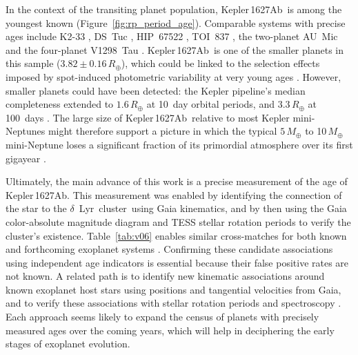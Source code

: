 \documentclass[12pt,modern,twocolumn,tighten,linenumbers,trackchanges]{aastex63}
\newcommand{\cn}{$\delta$\ Lyr\ cluster} %
\newcommand{\pn}{Kepler\,1627Ab} %
\begin{document}
In the context of the transiting planet population, \pn\ is among the
youngest known (Figure~\ref{fig:rp_period_age}).  Comparable systems
with precise ages include K2-33
\citep{Mann_K2_33b_2016,David_et_al_2017}, DS~Tuc
\citep{benatti_possibly_2019,newton_tess_2019} , HIP~67522
\citep{rizzuto_tess_2020}, TOI~837 \citep{bouma_cluster_2020}, the
two-planet AU~Mic \citep{plavchan_planet_2020,martioli_aumicbc_2021}
and the four-planet V1298~Tau \citep{david_four_2019}.  \pn\ is one of
the smaller planets in this sample ($3.82\pm0.16\,R_\oplus$), which
could be linked to the selection effects imposed by spot-induced
photometric variability at very young ages \citep[{\it
e.g.},][]{zhou_2021_tois}.  However, smaller planets could have been
detected: the Kepler pipeline's median completeness extended to
$1.6\,R_\oplus$ at 10~day orbital periods, and $3.3\,R_\oplus$ at
100~days \citep{2021ascl.soft07027B}.  The large size of \pn\ relative
to most Kepler mini-Neptunes might therefore support a picture
in which the typical $5\,M_\oplus$ to 10$\,M_\oplus$ mini-Neptune
\citep{wu_mass_2019} loses a significant fraction of its primordial
atmosphere over its first gigayear
\citep{Owen_Wu_2013,ginzburg_corepowered_2018}.  


Ultimately, the main advance of this work is a precise measurement of
the age of \pn.   This measurement was enabled by identifying the
connection of the star to the \cn\ using Gaia kinematics, and by then 
using the Gaia color-absolute magnitude diagram and TESS stellar
rotation periods to verify the cluster's existence.
Table~\ref{tab:v06} enables similar cross-matches for both known and
forthcoming exoplanet systems \citep[{\it
e.g.},][]{guerrero_tess_2021}. Confirming these candidate associations
using independent age indicators is essential because their false
positive rates are not known.  A related path is to identify new
kinematic associations around known exoplanet host stars using
positions and tangential velocities from Gaia, and to verify
these associations with stellar rotation periods and spectroscopy
\citep[{\it e.g.},][]{tofflemire_tess_2021}.  Each approach seems
likely to expand the census of planets with precisely measured ages
over the coming years, which will help in deciphering the early stages
of exoplanet evolution.
\end{document}

